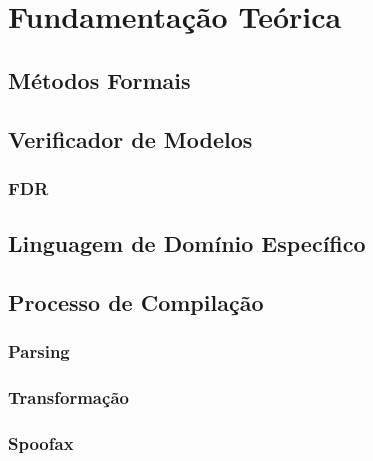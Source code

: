 \chapter{Fundamentação Teórica}
\label{chap:cap2}

\section{Métodos Formais}
\section{Verificador de Modelos}
\subsection{FDR}
\section{Linguagem de Domínio Específico}
\section{Processo de Compilação}
\subsection{Parsing}
\subsection{Transformação}
\subsection{Spoofax}